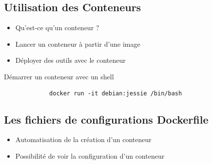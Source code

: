 \documentclass{beamer}
\begin{document}
    \subsection{Utilisation des Conteneurs}
    \begin{frame}[containsverbatim]
       \begin{itemize}
          \item{Qu'est-ce qu'un conteneur ?}
          \item{Lancer un conteneur à partir d'une image}
          \item{Déployer des outils avec le conteneur}
       \end{itemize}
     
       \begin{exampleblock}{Démarrer un conteneur avec un shell}
          \begin{verbatim}
             docker run -it debian:jessie /bin/bash
          \end{verbatim}
       \end{exampleblock}
    \end{frame}

    \subsection{Les fichiers de configurations Dockerfile}
    \begin{frame}
       \begin{itemize}
          \item{Automatisation de la création d'un conteneur}
	  \item{Possibilité de voir la configuration d'un conteneur}
       \end{itemize}
    \end{frame}
\end{document}
